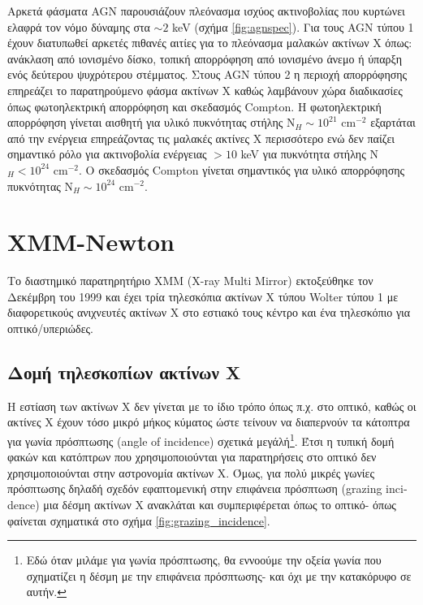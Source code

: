 Αρκετά φάσματα \textlatin{AGN} παρουσιάζουν πλεόνασμα ισχύος ακτινοβολίας που κυρτώνει ελαφρά τον νόμο δύναμης στα $\sim 2 $ \textlatin{keV} (σχήμα \ref{fig:agnspec}). Για τους \textlatin{AGN} τύπου 1 έχουν διατυπωθεί αρκετές πιθανές αιτίες για το πλεόνασμα μαλακών ακτίνων Χ όπως: ανάκλαση από ιονισμένο δίσκο, τοπική απορρόφηση από ιονισμένο άνεμο ή ύπαρξη ενός δεύτερου ψυχρότερου στέμματος. Στους \textlatin{AGN} τύπου 2 η περιοχή απορρόφησης επηρεάζει το παρατηρούμενο φάσμα ακτίνων Χ καθώς λαμβάνουν χώρα διαδικασίες όπως φωτοηλεκτρική απορρόφηση και σκεδασμός \textlatin{Compton}. Η φωτοηλεκτρική απορρόφηση γίνεται αισθητή για υλικό πυκνότητας στήλης N$_{H} \sim 10^{21}$ \textlatin{cm}$^{-2}$ εξαρτάται από την ενέργεια επηρεάζοντας τις μαλακές ακτίνες Χ περισσότερο ενώ δεν παίζει σημαντικό ρόλο για ακτινοβολία ενέργειας $> 10$ \textlatin{keV} για πυκνότητα στήλης N$_{H}<  10^{24}$ \textlatin{cm}$^{-2}$. Ο σκεδασμός \textlatin{Compton} γίνεται σημαντικός για υλικό απορρόφησης πυκνότητας N$_{H} \sim  10^{24}$ \textlatin{cm}$^{-2}$.

\section{\textlatin{XMM-Newton}}

Το διαστημικό παρατηρητήριο \textlatin{ΧΜΜ (X-ray Multi Mirror)} εκτοξεύθηκε τον Δεκέμβρη του 1999 και έχει τρία τηλεσκόπια ακτίνων Χ τύπου \textlatin{Wolter} τύπου 1 με διαφορετικούς ανιχνευτές ακτίνων Χ στο εστιακό τους κέντρο και ένα τηλεσκόπιο για οπτικό/υπεριώδες.

\subsection{Δομή τηλεσκοπίων ακτίνων Χ}

Η εστίαση των ακτίνων Χ δεν γίνεται με το ίδιο τρόπο όπως π.χ. στο οπτικό, καθώς οι ακτίνες Χ έχουν τόσο μικρό μήκος κύματος ώστε τείνουν να διαπερνούν τα κάτοπτρα για γωνία πρόσπτωσης (\textlatin{angle of incidence}) σχετικά μεγάλή\footnote{Εδώ όταν μιλάμε για γωνία πρόσπτωσης, θα εννοούμε την οξεία γωνία που σχηματίζει η δέσμη με την επιφάνεια πρόσπτωσης- και όχι με την κατακόρυφο σε αυτήν.}. Έτσι η τυπική δομή φακών και κατόπτρων που χρησιμοποιούνται για παρατηρήσεις στο οπτικό δεν χρησιμοποιούνται στην αστρονομία ακτίνων Χ. Όμως, για πολύ μικρές γωνίες πρόσπτωσης δηλαδή σχεδόν εφαπτομενική στην επιφάνεια πρόσπτωση (\textlatin{grazing incidence}) μια δέσμη ακτίνων Χ ανακλάται και συμπεριφέρεται όπως το οπτικό- όπως φαίνεται σχηματικά στο σχήμα \ref{fig:grazing_incidence}.

